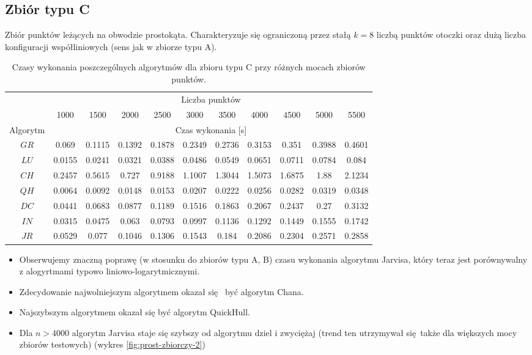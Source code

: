 \documentclass[11pt]{article}
\theoremstyle{remark} \newtheorem{definition}{def.}
\theoremstyle{definition} \newtheorem{twierdzenie}{tw.}
\begin{document}
\subsection{Zbiór typu C}

Zbiór punktów leżących na obwodzie prostokąta. Charakteryzuje się ograniczoną przez stałą $k = 8$ liczbą punktów otoczki oraz dużą liczba konfiguracji współliniowych (sens jak w zbiorze typu A). 

\begin{table}[h]
\centering
\caption{Czasy wykonania poszczególnych algorytmów dla zbioru typu C przy różnych mocach zbiorów punktów.}
\label{tab:prost}
\begin{tabular}{c|c|c|c|c|c|c|c|c|c|c|}
\cline{2-11}
\multicolumn{1}{l|}{} & \multicolumn{10}{c|}{Liczba punktów} \\ \cline{2-11} 
\multicolumn{1}{l|}{} & 1000 & 1500 & 2000 & 2500 & 3000 & 3500 & 4000 & 4500 & 5000 & 5500 \\ \hline
\multicolumn{1}{|c|}{Algorytm} & \multicolumn{10}{c|}{Czas wykonania {[}s{]}} \\ \hline
\multicolumn{1}{|c|}{$GR$} & 0.069 & 0.1115 & 0.1392 & 0.1878 & 0.2349 & 0.2736 & 0.3153 & 0.351 & 0.3988 & 0.4601 \\ \hline
\multicolumn{1}{|c|}{$LU$} & 0.0155 & 0.0241 & 0.0321 & 0.0388 & 0.0486 & 0.0549 & 0.0651 & 0.0711 & 0.0784 & 0.084 \\ \hline
\multicolumn{1}{|c|}{$CH$} & 0.2457 & 0.5615 & 0.727 & 0.9188 & 1.1007 & 1.3044 & 1.5073 & 1.6875 & 1.88 & 2.1234 \\ \hline
\multicolumn{1}{|c|}{$QH$} & 0.0064 & 0.0092 & 0.0148 & 0.0153 & 0.0207 & 0.0222 & 0.0256 & 0.0282 & 0.0319 & 0.0348 \\ \hline
\multicolumn{1}{|c|}{$DC$} & 0.0441 & 0.0683 & 0.0877 & 0.1189 & 0.1516 & 0.1863 & 0.2067 & 0.2437 & 0.27 & 0.3132 \\ \hline
\multicolumn{1}{|c|}{$IN$} & 0.0315 & 0.0475 & 0.063 & 0.0793 & 0.0997 & 0.1136 & 0.1292 & 0.1449 & 0.1555 & 0.1742 \\ \hline
\multicolumn{1}{|c|}{$JR$} & 0.0529 & 0.077 & 0.1046 & 0.1306 & 0.1543 & 0.184 & 0.2086 & 0.2304 & 0.2571 & 0.2858 \\ \hline
\end{tabular}
\end{table}


\begin{itemize}
    \item Obserwujemy znaczną poprawę (w stosunku do zbiorów typu A, B) czasu wykonania algorytmu Jarvisa, który teraz jest porównywalny z alogyrtmami typowo liniowo-logarytmicznymi. 
    \item Zdecydowanie najwolniejszym algorytmem okazał się  być algorytm Chana. 
    \item Najszybszym algorytmem okazał się być algorytm QuickHull.
    \item Dla $n > 4000$ algorytm Jarvisa staje się szybszy od algorytmu dziel i zwyciężaj (trend ten utrzymywał się także dla większych mocy zbiorów testowych) (wykres \ref{fig:prost-zbiorczy-2}) 
\end{itemize}
\end{document}
